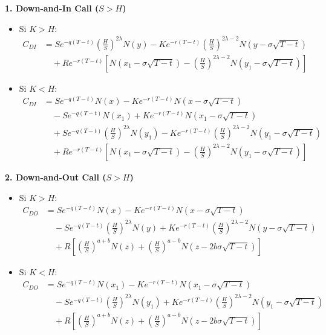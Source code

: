 \textbf{1. Down-and-In Call ($S > H$)}
\begin{itemize}
    \item Si $K > H$:
    \begin{align*}
    C_{DI} &= S e^{-q(T-t)} \left(\frac{H}{S}\right)^{2\lambda} N(y) - K e^{-r(T-t)} \left(\frac{H}{S}\right)^{2\lambda - 2} N(y - \sigma\sqrt{T-t}) \\
    &\quad + R e^{-r(T-t)} \left[ N(x_1 - \sigma \sqrt{T-t}) - \left(\frac{H}{S}\right)^{2\lambda - 2} N(y_1 - \sigma\sqrt{T-t}) \right]
    \end{align*}
    \item Si $K < H$:
    \begin{align*}
    C_{DI} &= S e^{-q(T-t)} N(x) - K e^{-r(T-t)} N(x - \sigma\sqrt{T-t}) \\
    &\quad - S e^{-q(T-t)} N(x_1) + K e^{-r(T-t)} N(x_1 - \sigma\sqrt{T-t}) \\
    &\quad + S e^{-q(T-t)} \left(\frac{H}{S}\right)^{2\lambda} N(y_1) - K e^{-r(T-t)}\left(\frac{H}{S}\right)^{2\lambda - 2} N(y_1 - \sigma\sqrt{T-t}) \\
    &\quad + R e^{-r(T-t)} \left[ N(x_1 - \sigma \sqrt{T-t}) - \left(\frac{H}{S}\right)^{2\lambda - 2} N(y_1 - \sigma\sqrt{T-t}) \right]
    \end{align*}
\end{itemize}

\textbf{2. Down-and-Out Call ($S > H$)}
\begin{itemize}
    \item Si $K > H$:
    \begin{align*}
    C_{DO} &= S e^{-q(T-t)} N(x) - K e^{-r(T-t)} N(x - \sigma\sqrt{T-t}) \\
    &\quad - S e^{-q(T-t)} \left(\frac{H}{S}\right)^{2\lambda} N(y) + K e^{-r(T-t)} \left(\frac{H}{S}\right)^{2\lambda - 2} N(y - \sigma\sqrt{T-t}) \\
    &\quad + R \left[ \left(\frac{H}{S}\right)^{a+b} N(z) + \left(\frac{H}{S}\right)^{a-b} N(z - 2b\sigma\sqrt{T-t}) \right]
    \end{align*}
    \item Si $K < H$:
    \begin{align*}
    C_{DO} &= S e^{-q(T-t)} N(x_1) - K e^{-r(T-t)} N(x_1 - \sigma\sqrt{T-t}) \\
    &\quad - S e^{-q(T-t)} \left(\frac{H}{S}\right)^{2\lambda} N(y_1) + K e^{-r(T-t)} \left(\frac{H}{S}\right)^{2\lambda - 2} N(y_1 - \sigma\sqrt{T-t}) \\
    &\quad + R \left[ \left(\frac{H}{S}\right)^{a+b} N(z) + \left(\frac{H}{S}\right)^{a-b} N(z - 2b\sigma\sqrt{T-t}) \right]
    \end{align*}
\end{itemize}

